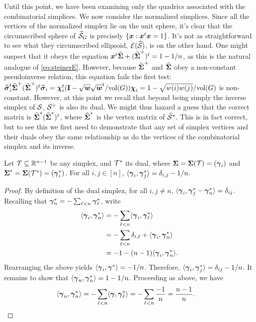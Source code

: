 Until this point, we have been examining only the quadrics associated with the combinatorial simplices. We now consider the normalized simplices. Since all the vertices of the normalized simplex lie on the unit sphere, it's clear  that the circumscribed sphere of $\widehat{\mathcal{S}}_G$ is precisely $\{\vb*{x}:\vb*{x}^t\vb*{x}=1\}$. It's not as straightforward  to see what they circumscribed ellipsoid, $\mathcal{E}(\widehat{\mathcal{S}})$, is on the other hand. One might suspect that it obeys the  equation $\vb*{x}^t \widehat{\boldsymbol{\Sigma}}+(\widehat{\boldsymbol{\Sigma}}^+)^t=1-1/n$, as this is the natural analogue of \eqref{eq:steinerE}. However, because $\widehat{\boldsymbol{\Sigma}}^+$ and $\widehat{\boldsymbol{\Sigma}}$ obey a non-constant pseudoinverse relation, this equation fails the first test: $\widehat{\vb*{\sigma}}_i^t\widehat{\boldsymbol{\Sigma}}^+(\widehat{\boldsymbol{\Sigma}}^+)^t\widehat{\vb*{\sigma}}_i = \boldsymbol{\chi}_i^t(\vb{I}-\sqrt{\vb*{w}}\sqrt{\vb*{w}}^t/\textnormal{vol}(G))\boldsymbol{\chi}_i=1-\sqrt{w(i)w(j)}/\textnormal{vol}(G)$ is non-constant. 
However, at this point we recall that beyond being simply  the inverse simplex of $\mathcal{S}$, $\mathcal{S}^+$ is also its dual.  We might thus hazard a guess that the correct matrix is $\widehat{\boldsymbol{\Sigma}}^* (\widehat{\boldsymbol{\Sigma}}^*)^t$, where $\widehat{\boldsymbol{\Sigma}}^*$ is the vertex matrix of $\widehat{\mathcal{S}}^*$. This is in fact correct, but to see this we first need to demonstrate that any set of simplex vertices and their  duals obey the same relationship as do the vertices of the combinatorial simplex and its inverse. 

\begin{lemma}
	\label{lem:dot_dual_vertices}
	Let  $\mathcal{T}\subseteq\mathbb{R}^{n-1}$ be any simplex, and $\mathcal{T}^*$ its dual, where $\boldsymbol{\Sigma}=\boldsymbol{\Sigma}(\mathcal{T})=(\vb*{\gamma}_i)$ and $\boldsymbol{\Sigma}^*=\boldsymbol{\Sigma}(\mathcal{T}^*)=(\vb*{\gamma}^*_i)$. 
	For all $i,j\in[n]$, $\langle \vb*{\gamma}_i,\vb*{\gamma}_j^*\rangle=\delta_{i,j}-1/n$. 
\end{lemma}
\begin{proof}
	By definition of the dual simplex, for all $i,j\neq n$, $\langle \vb*{\gamma}_i,\vb*{\gamma}^*_j-\vb*{\gamma}^*_n\rangle = \delta_{ij}$. Recalling that $\vb*{\gamma}^*_n=-\sum_{\ell<n}\vb*{\gamma}^*_\ell$, write 
	\begin{align*}
	\langle \vb*{\gamma}_i,\vb*{\gamma}^*_n\rangle &= - \sum_{\ell<n}\langle \vb*{\gamma}_i,\vb*{\gamma}^*_\ell\rangle \\
	&= -\sum_{\ell<n} \delta_{i,\ell} + \langle \vb*{\gamma}_i,\vb*{\gamma}^*_n\rangle \\
	&= -1 - (n-1)\langle\vb*{\gamma}_i,\vb*{\gamma}^*_n\rangle.
	\end{align*}
	Rearranging the above yields $\langle \vb*{\gamma}_i,\vb*{\gamma}^*\rangle = -1/n$. Therefore, $\langle \vb*{\gamma}_i,\vb*{\gamma}^*_j\rangle = \delta_{ij} - 1/n$. It remains to show that $\langle\vb*{\gamma}_n,\vb*{\gamma}^*_n\rangle=1-1/n$. Proceeding as above, we have 
	\begin{align*}
	\langle\vb*{\gamma}_n,\vb*{\gamma}^*_n\rangle &= -\sum_{\ell<n}\langle \vb*{\gamma},\vb*{\gamma}^*_\ell\rangle = -\sum_{\ell<n} \frac{-1}{n} = \frac{n-1}{n}.\qedhere
	\end{align*}
\end{proof}


